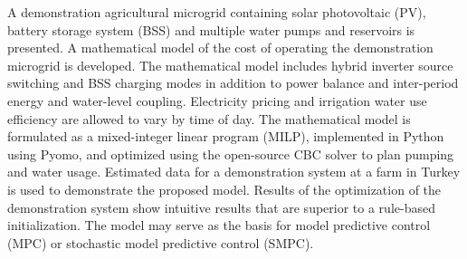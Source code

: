 A demonstration agricultural microgrid containing solar photovoltaic (PV), battery storage system (BSS) and multiple water pumps and reservoirs is presented.
A mathematical model of the cost of operating the demonstration microgrid is developed.
The mathematical model includes hybrid inverter source switching and BSS charging modes in addition to power balance and inter-period energy and water-level coupling.
Electricity pricing and irrigation water use efficiency are allowed to vary by time of day.
The mathematical model is formulated as a mixed-integer linear program (MILP),
implemented in Python using Pyomo, and optimized using the open-source CBC solver to plan pumping and water usage.
Estimated data for a demonstration system at a farm in Turkey is used to demonstrate the proposed model.
Results of the optimization of the demonstration system show intuitive results that are superior to a rule-based initialization.
The model may serve as the basis for model predictive control (MPC) or stochastic model predictive control (SMPC).